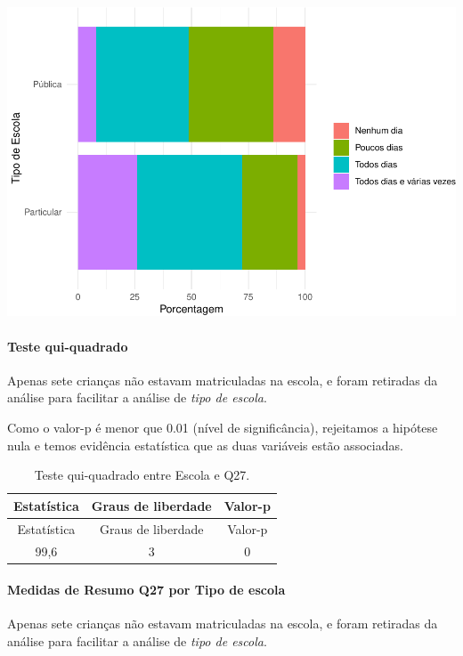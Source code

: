 \documentclass[]{article}
\let\oldparagraph\paragraph
\renewcommand{\paragraph}[1]{\oldparagraph{#1}\mbox{}}
\begin{document}
\begin{center}\includegraphics[width=0.75\linewidth]{relatorio_covid19_files/figure-latex/unnamed-chunk-821-1} \end{center}

\hypertarget{teste-qui-quadrado-71}{%
\paragraph{Teste qui-quadrado}\label{teste-qui-quadrado-71}}

Apenas sete crianças não estavam matriculadas na escola, e foram retiradas da análise para facilitar a análise de \emph{tipo de escola}.

Como o valor-p é menor que 0.01 (nível de significância), rejeitamos a hipótese nula e temos evidência estatística que as duas variáveis estão associadas.

\begin{longtable}[]{@{}ccc@{}}
\caption{\label{tab:unnamed-chunk-823}Teste qui-quadrado entre Escola e Q27.}\tabularnewline
\toprule
Estatística & Graus de liberdade & Valor-p\tabularnewline
\midrule
\endfirsthead
\toprule
Estatística & Graus de liberdade & Valor-p\tabularnewline
\midrule
\endhead
99,6 & 3 & 0\tabularnewline
\bottomrule
\end{longtable}

\cleardoublepage

\hypertarget{medidas-de-resumo-q27-por-tipo-de-escola}{%
\paragraph{Medidas de Resumo Q27 por Tipo de escola}\label{medidas-de-resumo-q27-por-tipo-de-escola}}

Apenas sete crianças não estavam matriculadas na escola, e foram retiradas da análise para facilitar a análise de \emph{tipo de escola}.
\end{document}
